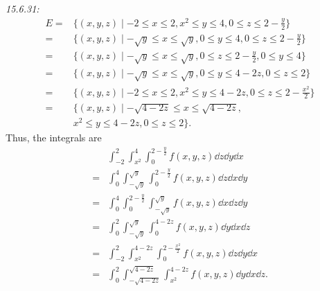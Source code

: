 \documentclass[8pt,twocolumn]{article}
\begin{document}
\begin{Answer}[number=20]
  \emph{15.6.31:}
  \begin{align*}
    E =&  \{ (x,y,z) \mid -2 \le x \le 2, x^2 \le y \le 4,  0 \le z \le 2-\frac{y}{2} \} \\
    = &\{ (x,y,z) \mid -\sqrt{y} \le x\le \sqrt{y}, 0 \le y \le 4, 0 \le z \le 2-\frac{y}{2} \} \\
    = &\{ (x,y,z) \mid -\sqrt{y} \le x\le \sqrt{y}, 0 \le z \le 2-\frac{y}{2}, 0 \le y \le 4 \} \\
    = &\{ (x,y,z) \mid -\sqrt{y} \le x\le \sqrt{y}, 0 \le y \le 4-2z, 0 \le z \le 2 \} \\
    = &\{ (x,y,z) \mid -2 \le x \le 2, x^2 \le y \le 4-2z, 0 \le z \le 2-\frac{x^2}{2} \} \\
    = &\{ (x,y,z) \mid -\sqrt{4-2z} \le x\le \sqrt{4-2z},\\ &x^2 \le y \le
    4-2z, 0 \le z \le 2 \}.
  \end{align*}
  Thus, the integrals are
  \begin{align*}
    &\int_{-2}^2 \int_{x^2}^4
    \int_0^{2-\frac{y}{2}} f(x,y,z) \dd{z}\dd{y}\dd{x} \\
 = &\int_0^4\int_{-\sqrt{y}}^{\sqrt{y}} \int_0^{2-\frac{y}{2}} f(x,y,z)\dd{z}\dd{x}\dd{y} \\
 = &\int_0^4 \int_0^{2-\frac{y}{2}} \int_{-\sqrt{y}}^{\sqrt{y}}
    f(x,y,z)\dd{x}\dd{z}\dd{y} \\
 = &\int_0^2 \int_{-\sqrt{y}}^{\sqrt{y}} \int_0^{4-2z} f(x,y,z) \dd{y}\dd{x}\dd{z} \\
 = &\int_{-2}^2 \int_{x^2}^{4-2z} \int_0^{2-\frac{x^2}{2}} f(x,y,z) \dd{z}\dd{y}\dd{x} \\
 = &\int_0^2 \int_{-\sqrt{4-2z}}^{\sqrt{4-2z}} \int_{x^2}^{4-2z} f(x,y,z) \dd{y}\dd{x}\dd{z}.
  \end{align*}
\end{Answer}
\end{document}
